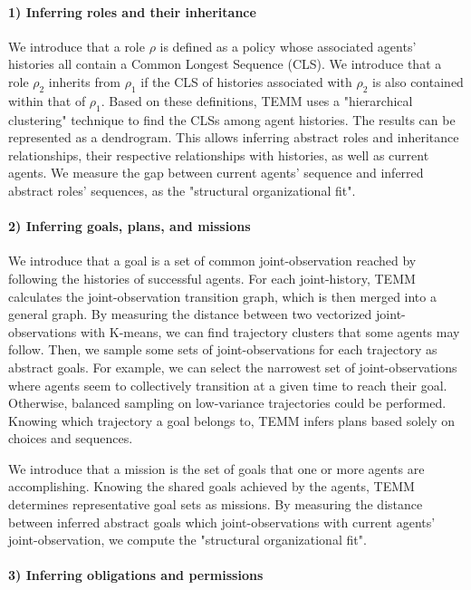 \documentclass[pdflatex,sn-mathphys-num]{sn-jnl}%
\theoremstyle{thmstyleone}%
\theoremstyle{thmstyletwo}%
\theoremstyle{thmstylethree}%
\begin{document}
\paragraph{\textbf{1) Inferring roles and their inheritance}}

We introduce that a role $\rho$ is defined as a policy whose associated agents' histories all contain a Common Longest Sequence (CLS). We introduce that a role $\rho_2$ inherits from $\rho_1$ if the CLS of histories associated with $\rho_2$ is also contained within that of $\rho_1$.
Based on these definitions, TEMM uses a "hierarchical clustering" technique to find the CLSs among agent histories. The results can be represented as a dendrogram. This allows inferring abstract roles and inheritance relationships, their respective relationships with histories, as well as current agents.
We measure the gap between current agents' sequence and inferred abstract roles' sequences, as the "structural organizational fit".

\paragraph{\textbf{2) Inferring goals, plans, and missions}}

We introduce that a goal is a set of common joint-observation reached by following the histories of successful agents.
For each joint-history, TEMM calculates the joint-observation transition graph, which is then merged into a general graph. By measuring the distance between two vectorized joint-observations with K-means, we can find trajectory clusters that some agents may follow. Then, we sample some sets of joint-observations for each trajectory as abstract goals. For example, we can select the narrowest set of joint-observations where agents seem to collectively transition at a given time to reach their goal. Otherwise, balanced sampling on low-variance trajectories could be performed. Knowing which trajectory a goal belongs to, TEMM infers plans based solely on choices and sequences.

We introduce that a mission is the set of goals that one or more agents are accomplishing.
Knowing the shared goals achieved by the agents, TEMM determines representative goal sets as missions.
By measuring the distance between inferred abstract goals which joint-observations with current agents' joint-observation, we compute the "structural organizational fit".

\paragraph{\textbf{3) Inferring obligations and permissions}}
\end{document}

